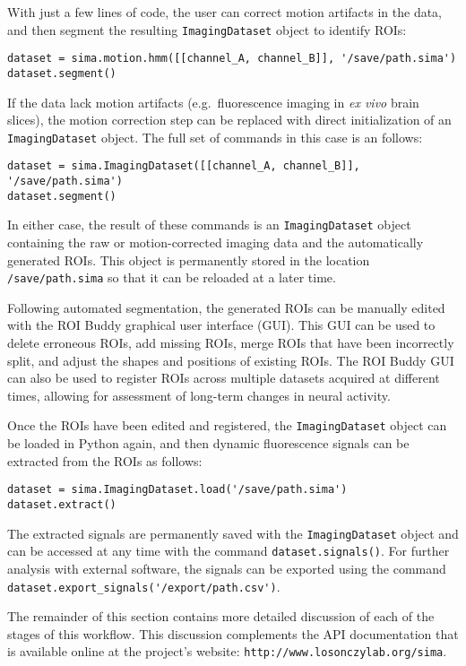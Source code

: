 With just a few lines of code, the user can correct motion artifacts in the data,
and then segment the resulting \verb|ImagingDataset| object to identify 
ROIs:
\begin{verbatim}
dataset = sima.motion.hmm([[channel_A, channel_B]], '/save/path.sima')
dataset.segment()
\end{verbatim}
If the data lack motion artifacts (e.g.\ fluorescence imaging in \textit{ex vivo} brain slices), 
the motion correction step can be replaced with direct initialization of an
\verb|ImagingDataset| object.
The full set of commands in this case is an follows:
\begin{verbatim}
dataset = sima.ImagingDataset([[channel_A, channel_B]], '/save/path.sima')
dataset.segment()
\end{verbatim}
In either case, the result of these commands is an \verb|ImagingDataset| object
containing the raw or motion-corrected imaging data and the automatically
generated ROIs.
This object is permanently stored in the location \verb|/save/path.sima|
so that it can be reloaded at a later time.

Following automated segmentation, the generated ROIs can be manually edited with the ROI Buddy graphical user interface (GUI).
This GUI can be used to delete erroneous ROIs, add missing ROIs, merge ROIs that have been incorrectly split, and adjust the shapes and positions of existing ROIs.
The ROI Buddy GUI can also be used to register ROIs across multiple datasets acquired at different times, 
allowing for assessment of long-term changes in neural activity.

Once the ROIs have been edited and registered,
the \verb|ImagingDataset| object can be loaded in Python again,
and then dynamic fluorescence signals can be extracted from the ROIs as follows:
\begin{verbatim}
dataset = sima.ImagingDataset.load('/save/path.sima')
dataset.extract()
\end{verbatim}
The extracted signals are permanently saved with the \verb|ImagingDataset| object and can be accessed at any time with the command \verb|dataset.signals()|.
For further analysis with external software, the signals can be exported using the command \verb|dataset.export_signals('/export/path.csv')|.

The remainder of this section contains more detailed discussion of each of the 
stages of this workflow.
This discussion complements the API documentation that is available online at the project's website: \verb|http://www.losonczylab.org/sima|.


